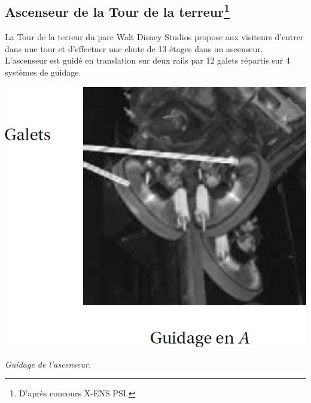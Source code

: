 \documentclass[10pt,fleqn]{article} %
\begin{document}
\def\pathfig{images}

\vspace{4.5cm}
\pagestyle{fancy}
\thispagestyle{plain}

\def\columnseprulecolor{\color{ocre}}
\setlength{\columnseprule}{0.4pt} 

\def\pathfig{images}


\ifprof
\begin{multicols}{2}
\else
\begin{multicols}{2}
\fi



\subsection*{Ascenseur de la Tour de la terreur\footnote{D'après concours X-ENS PSI.}}%

La Tour de la terreur du parc Walt Disney Studios propose aux visiteurs d'entrer dans une tour et d'effectuer une chute de 13 étages dans un ascenseur.
L'ascenseur est guidé en translation sur deux rails par 12 galets répartis sur 4 systèmes de guidage.

\begin{center}
\includegraphics[width=.6\linewidth]{images/fig_01}

\textit{Guidage de l'ascenseur.}
\end{center}

%
%


\end{multicols}
\end{multicols}
\end{document}
